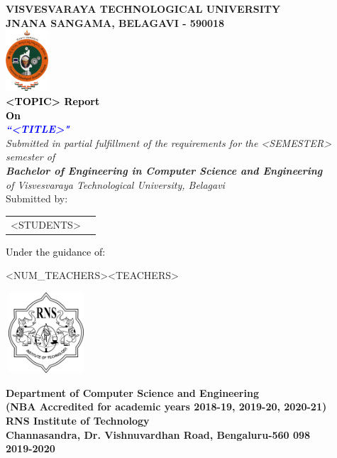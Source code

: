 \thispagestyle{empty}
\begin{titlepage}
\begin{center}
\textup{\large{\textcolor{darkbrown}{\bf VISVESVARAYA TECHNOLOGICAL UNIVERSITY} \\ {\textcolor{darkbrown}{\bf JNANA SANGAMA, BELAGAVI - 590018}}}}\\
\includegraphics[width=0.12\textwidth]{./../static/media/VTU.png}\\
\textup{\small{\textcolor{black}{\textbf{<TOPIC> Report} \\ {\textbf{On}}}}} \\
\textup{\large{\textcolor{blue}{\textbf{\textit{``<TITLE>"}}}}} \\

\textup{{\textit {Submitted in partial fulfillment of the requirements for the <SEMESTER> semester of} \\ {\textbf {\textit {Bachelor of Engineering in Computer Science and Engineering}} \\ \textit {of Visvesvaraya Technological University, Belagavi}}}}\\

\textup{Submitted by:} 
\break\break
\begin{tabular}{l l}<STUDENTS>
\end{tabular}
\break\break
\textup{\normalsize{\textcolor{black}{ Under the guidance of:}}}\break\break
\renewcommand\tabularxcolumn[1]{>{\Centering}p{#1}}
\begin{tabularx}{\linewidth}{<NUM_TEACHERS>}<TEACHERS>
\end{tabularx}
\renewcommand\tabularxcolumn[1]{}
\vfill
\includegraphics[width=3cm, height=3cm]{../static/media/RNS_logo.png}

\textup{\normalsize {\textcolor{darkbrown}{\bf Department of Computer Science and Engineering} \\ \textup{\small \bf \textcolor{darkbrown}{(NBA Accredited for academic years 2018-19, 2019-20, 2020-21)}} \\ {\textcolor{darkbrown}{\bf \bf{RNS Institute of Technology}}}}}\\
\textup{\small {\textcolor{darkbrown}{\bf Channasandra, Dr. Vishnuvardhan Road, Bengaluru-560 098}\\ \textbf {\textcolor{darkbrown}{2019-2020}}}}
\end{center}
\end{titlepage}
\vfill
\pagebreak